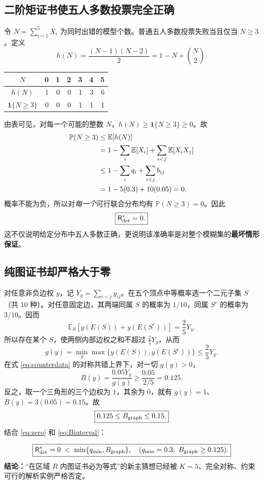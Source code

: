 \documentclass[11pt,a4paper]{ctexart}
\theoremstyle{definition}
\newcommand{\Risk}{\mathsf R}
\newcommand{\I}{\mathbf 1}
\newcommand{\E}{\mathbb E}
\newcommand{\Prb}{\mathbb P}
\begin{document}
\subsection{二阶矩证书使五人多数投票完全正确}
令 $N=\sum_{i=1}^5X_i$ 为同时出错的模型个数。普通五人多数投票失败当且仅当 $N\ge3$。定义
\begin{equation}\label{eq:hk}
h(N)=\frac{(N-1)(N-2)}2=1-N+\binom N2.
\end{equation}
\begin{center}
\begin{tabular}{@{}c r r r r r r@{}}
\toprule
$N$ &0&1&2&3&4&5\\
\midrule
$h(N)$ &1&0&0&1&3&6\\
$\I\{N\ge3\}$ &0&0&0&1&1&1\\
\bottomrule
\end{tabular}
\end{center}
由表可见，对每一个可能的整数 $N$，$h(N)\ge\I\{N\ge3\}\ge0$。故
\begin{align}\label{eq:momentbound}
\Prb(N\ge3)
&\le\E[h(N)]\\
&=1-\sum_i\E[X_i]+\sum_{i<j}\E[X_iX_j]\notag\\
&\le1-\sum_iq_i+\sum_{i<j}b_{ij}\notag\\
&=1-5(0.3)+10(0.05)=0.\notag
\end{align}
概率不能为负，所以对\emph{每一个}可行联合分布均有 $\Prb(N\ge3)=0$。因此
\begin{equation}\label{eq:zero}
\boxed{\Risk^*_{\rm det}=0.}
\end{equation}
这不仅说明给定分布中五人多数正确，更说明该准确率是对整个模糊集的\textbf{最坏情形保证}。

\subsection{纯图证书却严格大于零}
对任意非负边权 $y$，记 $Y_y=\sum_{i<j}y_{ij}$。在五个顶点中等概率选一个二元子集 $S$（共 $10$ 种）。对任意固定边，其两端同属 $S$ 的概率为 $1/10$，同属 $S^c$ 的概率为 $3/10$。因而
\[
\E_S[y(E(S))+y(E(S^c))]=\frac{2}{5}Y_y.
\]
所以存在某个 $S$，使两侧内部边权之和不超过 $\frac25Y_y$，从而
\begin{equation}\label{eq:gK5}
g(y)=\min_S\max\{y(E(S)),y(E(S^c))\}\le\frac25Y_y.
\end{equation}
在式 \eqref{eq:counterdata} 的对称共错上界下，对一切 $g(y)>0$，
\[
B(y)=\frac{0.05Y_y}{g(y)}\ge\frac{0.05}{2/5}=0.125.
\]
反之，取一个三角形的三个边权为 $1$，其余为 $0$，就有 $g(y)=1$、$B(y)=3(0.05)=0.15$。故
\begin{equation}\label{eq:Binterval}
\boxed{0.125\le B_{\rm graph}\le0.15.}
\end{equation}
结合 \eqref{eq:zero} 和 \eqref{eq:Binterval}：
\begin{resultbox}
\begin{equation}\label{eq:contradiction}
\boxed{\Risk^*_{\rm det}=0\;<\;\min\{q_{\min},B_{\rm graph}\},\quad
(q_{\min}=0.3,\ B_{\rm graph}\ge0.125).}
\end{equation}
\textbf{结论：}“在区域 $R$ 内图证书必为等式”的新主猜想已经被 $K=5$、完全对称、约束可行的解析实例严格否定。
\end{resultbox}
\end{document}

